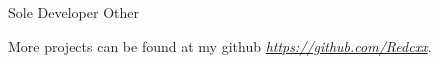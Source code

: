 \begin{cventries}
  \cventry
    {Sole Developer} %
    {Other} %
    {} %
    {} %
    {
      \begin{cvitems} %
        \item {More projects can be found at my github \href{https://github.com/Redcxx}{\textit{https://github.com/Redcxx}}.}
      \end{cvitems}
    }
  
    


\end{cventries}
